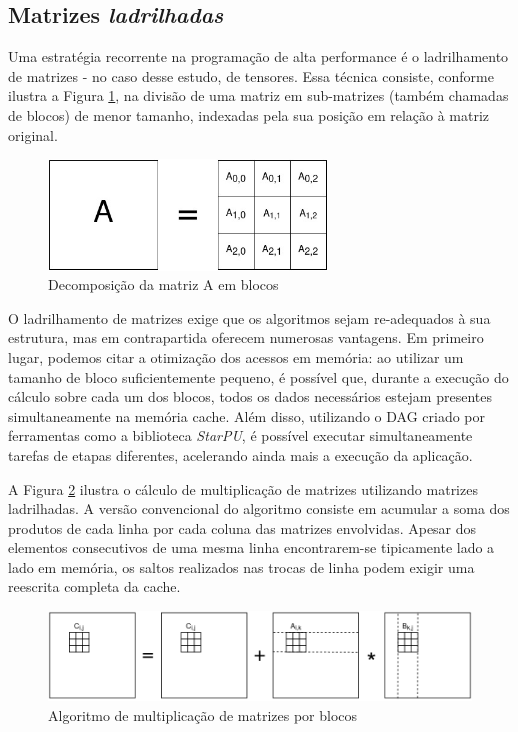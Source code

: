 \documentclass[cic,tc]{iiufrgs}
\begin{document}
\subsection{Matrizes \textit{ladrilhadas}}

Uma estratégia recorrente na programação de alta performance é o ladrilhamento de matrizes - no caso desse estudo, de tensores. Essa técnica consiste, conforme ilustra a Figura \ref{fig:tiled_matrix},
na divisão de uma matriz em sub-matrizes (também chamadas de blocos) de menor tamanho, indexadas pela sua posição em relação à matriz original.

\begin{figure}[!htb]
    \caption{Decomposição da matriz A em blocos}
    \begin{center}
      \includegraphics[width=20em]{tiled_matrix}
    \end{center}
    \label{fig:tiled_matrix}
\end{figure}

O ladrilhamento de matrizes exige que os algoritmos sejam re-adequados à sua estrutura, mas em contrapartida oferecem numerosas vantagens. Em primeiro lugar, podemos citar a
otimização dos acessos em memória: ao utilizar um tamanho de bloco suficientemente pequeno, é possível que, durante a execução do cálculo sobre cada um dos blocos, todos os dados
necessários estejam presentes simultaneamente na memória cache. Além disso, utilizando o DAG criado por ferramentas como a biblioteca \textit{StarPU}, é possível executar
simultaneamente tarefas de etapas diferentes, acelerando ainda mais a execução da aplicação.

A Figura \ref{fig:gemm} ilustra o cálculo de multiplicação de matrizes utilizando matrizes ladrilhadas. A versão convencional do algoritmo consiste em acumular a soma dos produtos de
cada linha por cada coluna das matrizes envolvidas. Apesar dos elementos consecutivos de uma mesma linha encontrarem-se tipicamente lado a lado em memória, os saltos realizados nas trocas
de linha podem exigir uma reescrita completa da cache.

\begin{figure}[!htb]
    \caption{Algoritmo de multiplicação de matrizes por blocos}
    \begin{center}
      \includegraphics[width=33em]{gemm}
    \end{center}
    \label{fig:gemm}
\end{figure}
\end{document}
